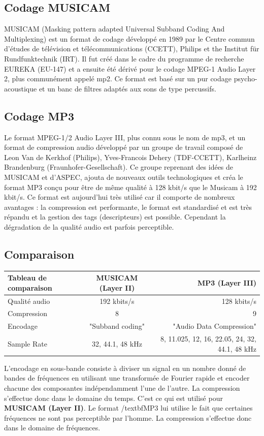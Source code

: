 \documentclass[a4paper,10pt, french]{article}
\begin{document}
  \subsection{Codage MUSICAM}
  MUSICAM (Masking pattern adapted Universal Subband Coding And Multiplexing) est un format de codage développé en 1989 par le Centre commun d'études de télévision et télécommunications (CCETT), Philips et the Institut für Rundfunktechnik (IRT).
Il fut créé dans le cadre du programme de recherche EUREKA (EU-147) et a ensuite été dérivé pour le codage MPEG-1 Audio Layer 2, plus communément appelé mp2.
Ce format est basé sur un pur codage psycho-acoustique et un banc de filtres adaptés aux sons de type percussifs.
  \subsection{Codage MP3}
  Le format MPEG-1/2 Audio Layer III, plus connu sous le nom de mp3, et un format de compression audio développé par un groupe de travail composé de  Leon Van de Kerkhof (Philips), Yves-Francois Dehery (TDF-CCETT), Karlheinz Brandenburg (Fraunhofer-Gesellschaft).
Ce groupe reprenant des idées de MUSICAM et d'ASPEC, ajouta de nouveaux outils technologiques et créa le format MP3 conçu pour être de même qualité à 128 kbit/s que le Musicam à 192 kbit/s. Ce format est aujourd'hui très utilisé car il comporte de nombreux avantages : la compression est performante, le format est standardisé et est très répandu et la gestion des tags (descripteurs) est possible. Cependant la dégradation de la qualité audio est parfois perceptible.
  \subsection{Comparaison}
    \begin{tabular}{| l  | c | r | }
      \hline
      Tableau de comparaison & MUSICAM (Layer II) & MP3 (Layer III) \\ \hline \hline
      Qualité audio & 192 kbits/s & 128 kbits/s \\
      Compression & 8 & 9 \\
      Encodage & "Subband coding"& "Audio Data Compression" \\
      Sample Rate & 32, 44.1, 48 kHz & 8, 11.025, 12, 16, 22.05, 24, 32, 44.1, 48 kHz \\
      \hline
    \end{tabular}
    \newline
    L'encodage en sous-bande consiste à diviser un signal en un nombre donné de bandes de fréquences en utilisant une transformée de Fourier rapide et encoder chacune des composantes indépendamment l'une de l'autre. La compression s'effectue donc dans le domaine du temps. C'est ce qui est utilisé pour \textbf{MUSICAM (Layer II)}. Le format /textbf{MP3} lui utilise le fait que certaines fréquences ne sont pas perceptible par l'homme. La compression s'effectue donc dans le domaine de fréquences.
\end{document}
